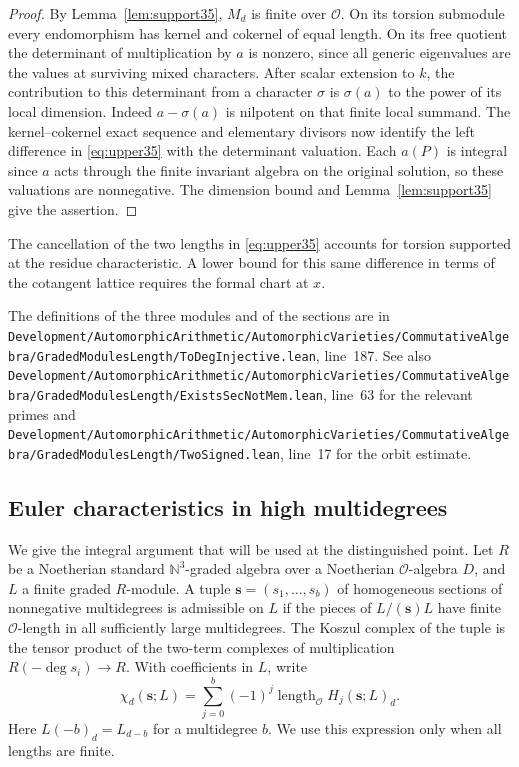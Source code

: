 \documentclass[a4paper,11pt]{article}
\theoremstyle{definition}
\theoremstyle{remark}
\newcommand{\lead}[1]{\par\smallskip\noindent{\bfseries\color{ink}#1.}\enspace}
\newcommand{\len}{\operatorname{length}}\newcommand{\Res}{\operatorname*{Res}}
\newcommand{\srcloc}[2]{{\small\nolinkurl{#1.lean}}, line~#2}
\numberwithin{equation}{section}
\newcommand{\OO}{\mathcal O}
\begin{document}
\begin{proof}
By Lemma~\ref{lem:support35}, \(M_d\) is finite over \(\OO\). On its torsion submodule every endomorphism has kernel and cokernel of equal length. On its free quotient the determinant of multiplication by \(a\) is nonzero, since all generic eigenvalues are the values at surviving mixed characters. After scalar extension to \(k\), the contribution to this determinant from a character \(\sigma\) is \(\sigma(a)\) to the power of its local dimension. Indeed \(a-\sigma(a)\) is nilpotent on that finite local summand. The kernel--cokernel exact sequence and elementary divisors now identify the left difference in \eqref{eq:upper35} with the determinant valuation. Each \(a(P)\) is integral since \(a\) acts through the finite invariant algebra on the original solution, so these valuations are nonnegative. The dimension bound and Lemma~\ref{lem:support35} give the assertion.
\end{proof}

The cancellation of the two lengths in \eqref{eq:upper35} accounts for torsion supported at the residue characteristic. A lower bound for this same difference in terms of the cotangent lattice requires the formal chart at \(x\).

\lead{Locations in the accompanying source} The definitions of the three modules and of the sections are in \srcloc{Development/AutomorphicArithmetic/AutomorphicVarieties/CommutativeAlgebra/GradedModulesLength/ToDegInjective}{187}. See also \srcloc{Development/AutomorphicArithmetic/AutomorphicVarieties/CommutativeAlgebra/GradedModulesLength/ExistsSecNotMem}{63} for the relevant primes and \srcloc{Development/AutomorphicArithmetic/AutomorphicVarieties/CommutativeAlgebra/GradedModulesLength/TwoSigned}{17} for the orbit estimate.

\subsection{Euler characteristics in high multidegrees}\label{nav:IV-07}
\label{sec:koszul36}

We give the integral argument that will be used at the distinguished point. Let \(R\) be a Noetherian standard \(\mathbb N^3\)-graded algebra over a Noetherian \(\OO\)-algebra \(D\), and \(L\) a finite graded \(R\)-module. A tuple \(\mathbf s=(s_1,\ldots,s_b)\) of homogeneous sections of nonnegative multidegrees is admissible on \(L\) if the pieces of \(L/(\mathbf s)L\) have finite \(\OO\)-length in all sufficiently large multidegrees. The Koszul complex of the tuple is the tensor product of the two-term complexes of multiplication \(R(-\deg s_i)\to R\). With coefficients in \(L\), write
\[
 \chi_d(\mathbf s;L)=\sum_{j=0}^{b}(-1)^j
             \len_{\OO} H_j(\mathbf s;L)_d .
\]
Here \(L(-b)_d=L_{d-b}\) for a multidegree \(b\). We use this expression only when all lengths are finite.
\end{document}

